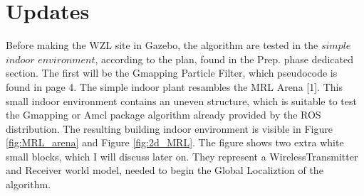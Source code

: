 \documentclass[11pt,a4paper]{article}
\begin{document}
\section{Updates}

Before making the WZL site in Gazebo, the algorithm are tested in the $simple$ $indoor$ $environment$, according to the plan, found in the Prep. phase dedicated section. The first will be the Gmapping Particle Filter, which pseudocode is found in page 4. The simple indoor plant resambles the MRL Arena [1]. This small indoor environment contains an uneven structure, which is suitable to test the Gmapping or Amcl package algorithm already provided by the ROS distribution. The resulting building indoor environment is visible in Figure \ref{fig:MRL_arena} and Figure \ref{fig:2d_MRL}. The figure shows two extra white small blocks, which I will discuss later on. They represent a WirelessTransmitter and Receiver world model, needed to begin the Global Localiztion of the algorithm.
\end{document}
